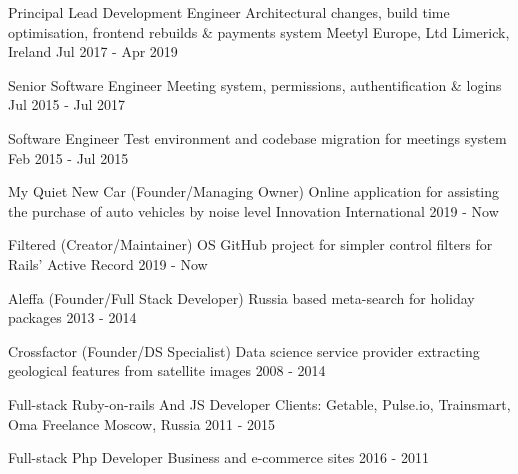 
\begin{cventries}

  \cvblitz
    {Principal Lead Development Engineer} %
    {Architectural changes, build time optimisation, frontend rebuilds \& payments system}
    {Meetyl Europe, Ltd} %
    {Limerick, Ireland} %
    {Jul 2017 - Apr 2019} %

    \cvblitz
    {Senior Software Engineer} %
    {Meeting system, permissions, authentification \& logins} %
    {} %
    {} %
    {Jul 2015 - Jul 2017} %

    \cvblitz
    {Software Engineer} %
    {Test environment and codebase migration for meetings system} %
    {} %
    {} %
    {Feb 2015 - Jul 2015} %

  \cvblitz
    {My Quiet New Car (Founder/Managing Owner)} %
    {Online application for assisting the purchase of auto vehicles by noise level} %
    {Innovation} %
    {International} %
    {2019 - Now} %

    \cvblitz
    {Filtered (Creator/Maintainer)} %
    {OS GitHub project for simpler control filters for Rails’ Active Record} %
    {} %
    {} %
    {2019 - Now} %

    \cvblitz
    {Aleffa (Founder/Full Stack Developer)} %
    {Russia based meta-search for holiday packages} %
    {} %
    {} %
    {2013 - 2014} %

    \cvblitz
    {Crossfactor (Founder/DS Specialist)} %
    {Data science service provider extracting geological features from satellite images} %
    {} %
    {} %
    {2008 - 2014} %

  \cvblitz
    {Full-stack Ruby-on-rails And JS Developer} %
    {Clients: Getable, Pulse.io, Trainsmart, Oma} %
    {Freelance} %
    {Moscow, Russia} %
    {2011 - 2015} %

    \cvblitz
    {Full-stack Php Developer} %
    {Business and e-commerce sites} %
    {} %
    {} %
    {2016 - 2011} %

\end{cventries}
